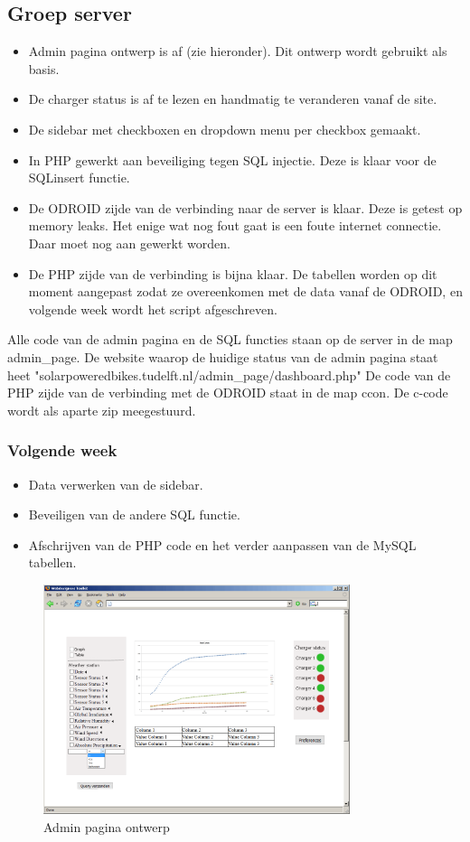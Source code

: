 \subsection*{Groep server}
\begin{itemize}
\item
Admin pagina ontwerp is af (zie hieronder). Dit ontwerp wordt gebruikt als basis.
\item
De charger status is af te lezen en handmatig te veranderen vanaf de site.
\item
De sidebar met checkboxen en dropdown menu per checkbox gemaakt.
\item
In PHP gewerkt aan beveiliging tegen SQL injectie. Deze is klaar voor de SQLinsert functie.
\item
De ODROID zijde van de verbinding naar de server is klaar. Deze is getest op memory leaks. Het enige wat nog fout gaat is een foute internet connectie. Daar moet nog aan gewerkt worden.
\item
De PHP zijde van de verbinding is bijna klaar. De tabellen worden op dit moment aangepast zodat ze overeenkomen met de data vanaf de ODROID, en volgende week wordt het script afgeschreven.
\end{itemize}
Alle code van de admin pagina en de SQL functies staan op de server in de map admin\_page.
De website waarop de huidige status van de admin pagina staat heet "solarpoweredbikes.tudelft.nl/admin\_page/dashboard.php"
De code van de PHP zijde van de verbinding met de ODROID staat in de map ccon.
De c-code wordt als aparte zip meegestuurd.


\subsubsection*{Volgende week}
\begin{itemize}
\item
Data verwerken van de sidebar.
\item
Beveiligen van de andere SQL functie.
\item
Afschrijven van de PHP code en het verder aanpassen van de MySQL tabellen.
\end{itemize}

\begin{figure}[htbp]
\includegraphics[width=0.8\textwidth]{adminpage}
\caption{Admin pagina ontwerp}
\end{figure}
